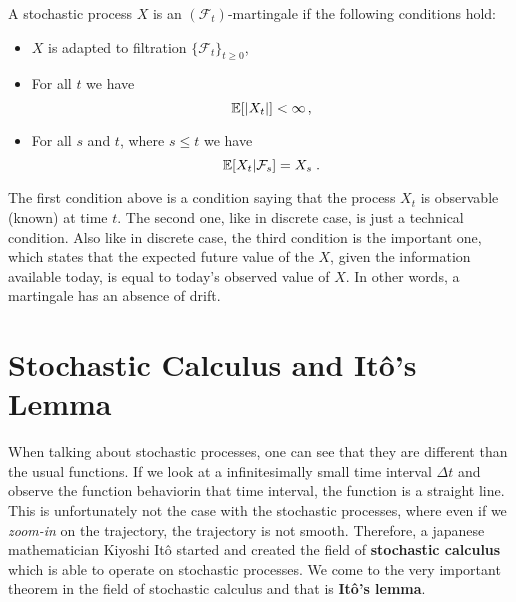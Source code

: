 \documentclass[times, utf8, diplomski]{fer}
\begin{document}
\begin{definition}
A stochastic process $X$ is an $(\mathcal{F}_t)$-martingale if the following conditions hold:
\begin{itemize}
	\item $X$ is adapted to filtration $\{\mathcal{F}_t\}_{t\geq 0}$,
	\item For all $t$ we have $$\mathbb{E}[|X_t|] < \infty \hspace{0.05cm},$$
	\item For all $s$ and $t$, where $s\leq t$ we have $$\mathbb{E}[X_t|\mathcal{F}_s] = X_s\hspace{0.1cm}.$$
\end{itemize}
\end{definition}

\noindent The first condition above is a condition saying that the process $X_t$ is observable (known) at time $t$. The second one, like in discrete case, is just a technical condition. Also like in discrete case, the third condition is the important one, which states that the expected future value of the $X$, given the information available today, is equal to today's observed value of $X$. In other words, a martingale has an absence of drift.

\section{Stochastic Calculus and It\^{o}'s Lemma}
When talking about stochastic processes, one can see that they are different than the usual functions. If we look at a infinitesimally small time interval $\Delta t$ and observe the function behaviorin that time interval, the function is a straight line. This is unfortunately not the case with the stochastic processes, where even if we \textit{zoom-in} on the trajectory, the trajectory is not smooth. Therefore, a japanese mathematician Kiyoshi It\^{o} started and created the field of \textbf{stochastic calculus} which is able to operate on stochastic processes. We come to the very important theorem in the field of stochastic calculus and that is \textbf{It\^{o}'s lemma}.
\end{document}
